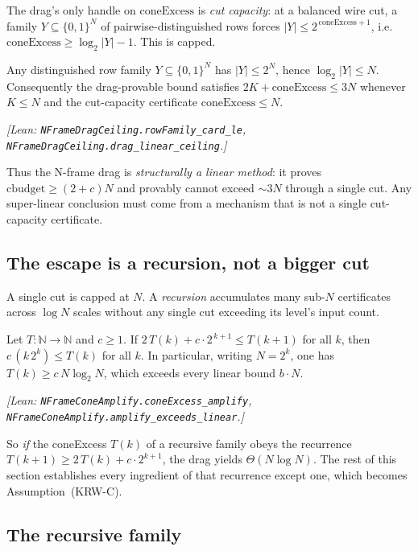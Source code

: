 The drag's only handle on $\mathrm{coneExcess}$ is \emph{cut capacity}: at a
balanced wire cut, a family $Y\subseteq\{0,1\}^N$ of pairwise-distinguished rows
forces $|Y|\le 2^{\,\mathrm{coneExcess}+1}$, i.e.\ $\mathrm{coneExcess}\ge
\log_2|Y|-1$.  This is capped.

\begin{lemma}
\label{lem:drag-ceiling}
Any distinguished row family $Y\subseteq\{0,1\}^N$ has $|Y|\le 2^N$, hence
$\log_2|Y|\le N$.  Consequently the drag-provable bound satisfies
$2K+\mathrm{coneExcess}\le 3N$ whenever $K\le N$ and the cut-capacity certificate
$\mathrm{coneExcess}\le N$.
\end{lemma}
\noindent\emph{[Lean: \texttt{NFrameDragCeiling.rowFamily\_card\_le},
\texttt{NFrameDragCeiling.drag\_linear\_ceiling}.]}

Thus the N-frame drag is \emph{structurally a linear method}: it proves
$\mathrm{cbudget}\ge(2+c)N$ and provably cannot exceed $\sim 3N$ through a single
cut.  Any super-linear conclusion must come from a mechanism that is not a single
cut-capacity certificate.

\subsection{The escape is a recursion, not a bigger cut}

A single cut is capped at $N$.  A \emph{recursion} accumulates many sub-$N$
certificates across $\log N$ scales without any single cut exceeding its level's
input count.

\begin{lemma}
\label{lem:amplify}
Let $T:\mathbb N\to\mathbb N$ and $c\ge 1$.  If
$2\,T(k)+c\cdot 2^{\,k+1}\le T(k+1)$ for all $k$, then $c\,(k\,2^{k})\le T(k)$ for
all $k$.  In particular, writing $N=2^{k}$, one has $T(k)\ge c\,N\log_2 N$, which
exceeds every linear bound $b\cdot N$.
\end{lemma}
\noindent\emph{[Lean: \texttt{NFrameConeAmplify.coneExcess\_amplify},
\texttt{NFrameConeAmplify.amplify\_exceeds\_linear}.]}

So \emph{if} the coneExcess $T(k)$ of a recursive family obeys the recurrence
$T(k{+}1)\ge 2\,T(k)+c\cdot 2^{k+1}$, the drag yields $\Theta(N\log N)$.  The rest
of this section establishes every ingredient of that recurrence except one, which
becomes Assumption~(KRW-C).

\subsection{The recursive family}

